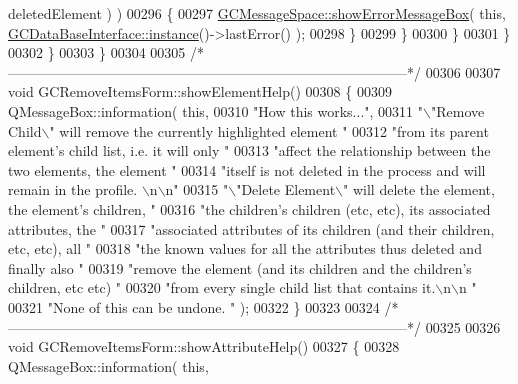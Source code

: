 \begin{DoxyCode}
{      deletedElement ) )
00296           \{
00297             \hyperlink{namespace_g_c_message_space_ab118b3a133686167617eb955029fd44e}{GCMessageSpace::showErrorMessageBox}( \textcolor{keyword}{this}, 
      \hyperlink{class_g_c_data_base_interface_a1baea9c0667aa8b610ec30076fcab84c}{GCDataBaseInterface::instance}()->lastError() );
00298           \}
00299         \}
00300       \}
00301     \}
00302   \}
00303 \}
00304 
00305 \textcolor{comment}{/*
      --------------------------------------------------------------------------------------*/}
00306 
00307 \textcolor{keywordtype}{void} GCRemoveItemsForm::showElementHelp()
00308 \{
00309   QMessageBox::information( \textcolor{keyword}{this},
00310                             \textcolor{stringliteral}{"How this works..."},
00311                             \textcolor{stringliteral}{"\(\backslash\)"Remove Child\(\backslash\)" will remove the currently
       highlighted element "}
00312                             \textcolor{stringliteral}{"from its parent element's child list, i.e. it will
       only "}
00313                             \textcolor{stringliteral}{"affect the relationship between the two elements,
       the element "}
00314                             \textcolor{stringliteral}{"itself is not deleted in the process and will
       remain in the profile. \(\backslash\)n\(\backslash\)n"}
00315                             \textcolor{stringliteral}{"\(\backslash\)"Delete Element\(\backslash\)" will delete the element, the
       element's children, "}
00316                             \textcolor{stringliteral}{"the children's children (etc, etc), its associated
       attributes, the "}
00317                             \textcolor{stringliteral}{"associated attributes of its children (and their
       children, etc, etc), all "}
00318                             \textcolor{stringliteral}{"the known values for all the attributes thus
       deleted and finally also "}
00319                             \textcolor{stringliteral}{"remove the element (and its children and the
       children's children, etc etc) "}
00320                             \textcolor{stringliteral}{"from every single child list that contains it.\(\backslash\)n\(\backslash\)n
      "}
00321                             \textcolor{stringliteral}{"None of this can be undone. "} );
00322 \}
00323 
00324 \textcolor{comment}{/*
      --------------------------------------------------------------------------------------*/}
00325 
00326 \textcolor{keywordtype}{void} GCRemoveItemsForm::showAttributeHelp()
00327 \{
00328   QMessageBox::information( \textcolor{keyword}{this},
}
\end{DoxyCode}
